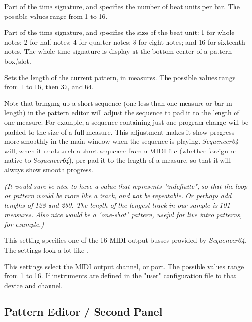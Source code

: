    Part of the time signature, and specifies the number of beat units per bar.
   The possible values range from 1 to 16.

   Part of the time signature, and specifies the size of the beat unit:
   1 for whole notes; 2 for half notes; 4 for quarter notes; 8 for eight notes;
   and 16 for sixteenth notes.
   The whole time signature is display at the bottom center of a pattern
   box/slot.

   Sets the length of the current pattern, in measures.
   The possible values range from 1 to 16, then 32, and 64.

   Note that bringing up a short sequence (one less than one measure or bar in
   length) in the pattern editor will adjust the sequence to pad it to the
   length of one measure.  For example, a sequence containing just one program
   change will be padded to the size of a full measure.
   This adjustment makes it show progress more smoothly in the main window when
   the sequence is playing.
   \textsl{Sequencer64} will, when it reads such a short sequence
   from a MIDI file (whether foreign or native to \textsl{Sequencer64}),
   pre-pad it to the length of a measure, so that it will always show smooth
   progress.

   \textsl{(It would sure be nice to have a value that represents
   "indefinite", so that the loop or pattern would be more like a track,
   and not be repeatable.  Or perhaps add lengths of 128 and 200.  The length
   of the longest track in our sample is 101 measures.
   Also nice would be a "one-shot"
   pattern, useful for live intro patterns, for example.)}

   This setting specifies one of the 16 MIDI output busses provided by
   \textsl{Sequencer64}.  The settings look a lot like
   .

   This settings select the MIDI output channel, or port.
   The possible values range from 1 to 16.
   If instruments are defined in the "user" configuration file
   to that device and channel.

\subsection{Pattern Editor / Second Panel}
\label{subsec:seq64_pattern_editor_second}

